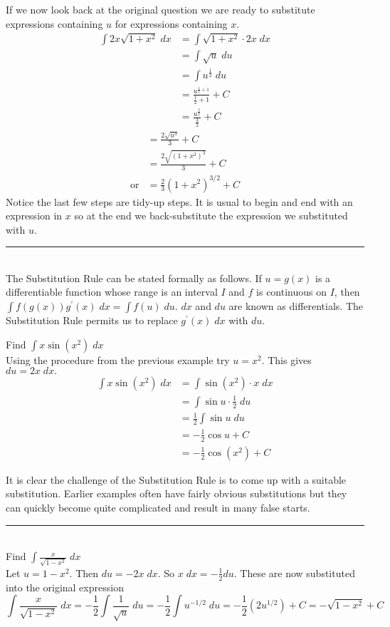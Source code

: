 If we now look back at the original question we are ready to substitute expressions containing $u$ for expressions containing $x$.
\begin{align*}\int 2 x \sqrt{1 +x^{2}}\; d x &  = \int \sqrt{1 +x^{2}} \cdot 2 x\; d x \\
 &  = \int \sqrt{u}\; d u \\
 &  = \int u^{\frac{1}{2}}\; d u \\
 &  = \frac{u^{\frac{1}{2} +1}}{\frac{1}{2} +1} +C \\
 &  = \frac{u^{\frac{3}{2}}}{\frac{3}{2}} +C\end{align*}
\begin{align*} &  = \frac{2 \sqrt{u^{3}}}{3} +C \\
 &  = \frac{2 \sqrt{\left (1 +x^{2}\right )^{3}}}{3} +C \\
\text{or} &  = \frac{2}{3} \left (1 +x^{2}\right )^{3/2} +C\end{align*}Notice the last few steps are tidy-up steps. It is usual to begin and end with an expression in $x$ so at the end we back-substitute the expression we substituted with $u$. \\
\rule{6.8cm}{0.5pt}\\
The Substitution Rule can be stated formally as follows. If $u =g (x)$ is a differentiable function whose range is an interval $I$ and $f$ is continuous on $I$, then $\int f \left (g \left (x\right )\right ) g^{ \prime } \left (x\right )\; d x =\int f \left (u\right )\; d u$. $d x$ and $d u$ are known as differentials. The Substitution Rule permits us to replace $g^{ \prime } \left (x\right )\; d x$ with $d u$. 

\example Find $\int x \sin  \left (x^{2}\right )\; dx$\medskip\\
\solution Using the procedure from the previous example try $u =x^{2}$. This gives $d u =2 x\; d x\text{.}$
\begin{align*}\int x \sin  \left (x^{2}\right )\; d x &  = \int \sin  \left (x^{2}\right ) \cdot x\; d x \\
 &  = \int \sin  u \cdot \frac{1}{2}\; d u \\
 &  = \frac{1}{2} \int \sin  u\; d u \\
 &  =  -\frac{1}{2} \cos  u +C \\
 &  =  -\frac{1}{2} \cos  \left (x^{2}\right ) +C\end{align*}

It is clear the challenge of the Substitution Rule is to come up with a suitable substitution. Earlier examples often have fairly obvious substitutions but they can quickly become quite complicated and result in many false starts. 
\rule{6.8cm}{0.5pt}\\
\example Find $\int \frac{x}{\sqrt{1 -x^{2}}}\; d x$\medskip\\
\solution Let $u =1 -x^{2}$. Then $d u = -2 x\; d x$. So $x\; d x = -\frac{1}{2} d u$. These are now substituted into the original expression
$$\int \frac{x}{\sqrt{1 -x^{2}}}\; d x = -\frac{1}{2} \int \frac{1}{\sqrt{u}}\; d u = -\frac{1}{2} \int u^{ -1/2}\; d u = -\frac{1}{2} \left (2 u^{1/2}\right ) +C = -\sqrt{1 -x^{2}} +C$$

